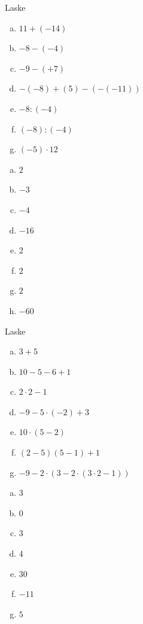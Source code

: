    \begin{tehtava}
    Laske
    \begin{enumerate}[a)]
        \item $11+(-14)$
        \item $-8-(-4)$
        \item $-9-(+7)$
        \item $-(-8)+(5)-(-(-11))$
        \item $-8:(-4)$
        \item $(-8):(-4)$
        \item $(-5)\cdot 12$
    \end{enumerate}
        \begin{vastaus}
        \begin{enumerate}[a)]
            \item $2$
            \item $-3$
            \item $-4$
            \item $-16$
            \item $2$
            \item $2$
            \item $2$
            \item $-60$
        \end{enumerate}
        \end{vastaus}
    \end{tehtava}

    \begin{tehtava}
        Laske
        \begin{enumerate}[a)]
            \item $3+5$
            \item $10-5-6+1$
            \item $2 \cdot 2 - 1$
            \item $-9 - 5 \cdot (-2) + 3$
            \item $10 \cdot (5 - 2)$
            \item $(2-5)(5 - 1) + 1$
            \item $-9 - 2 \cdot ( 3 - 2 \cdot (3\cdot2 - 1))$
        \end{enumerate}

        \begin{vastaus}
            \begin{enumerate}[a)]
                \item $3$
                \item $0$
                \item $3$
                \item $4$
                \item $30$
                \item $-11$
                \item $5$
            \end{enumerate}
        \end{vastaus}
    \end{tehtava}
    

